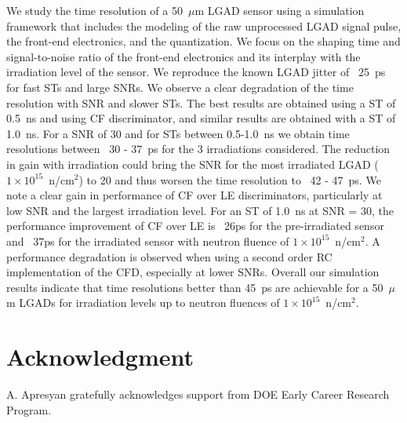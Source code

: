 \documentclass[preprint,1p]{elsarticle}
\begin{document}
We study the time resolution of a 50~$\mu$m LGAD sensor using a simulation framework that includes the
modeling of the raw unprocessed LGAD signal pulse, the front-end electronics, and the quantization.
We focus on the shaping time and signal-to-noise ratio of the front-end electronics and its interplay
with the irradiation level of the sensor. We reproduce the known LGAD jitter of ~25~\si{ps}
for fast STs and large SNRs. We observe a clear degradation of the time resolution with SNR and slower STs. The best results are
obtained using a ST of 0.5~\si{ns} and using CF discriminator, and similar results are obtained with a ST of 1.0~\si{ns}. For a SNR of 30
and for STs between 0.5-1.0~\si{ns} we obtain time resolutions between ~30 - 37~\si{ps} for the 3 irradiations considered. The
reduction in gain with irradiation could bring the SNR for the most irradiated LGAD ($1\times 10^{15}$~n/cm$^2$) to 20 and thus
worsen the time resolution to ~42 - 47~\si{ps}. We note a clear gain in performance of CF over LE discriminators, particularly at
low SNR and the largest irradiation level. For an ST of 1.0~\si{ns} at SNR = 30, the performance improvement of CF over LE
is ~26\si{ps} for the pre-irradiated sensor and ~37\si{ps} for the irradiated sensor with neutron fluence of
$1\times 10^{15}$~n/cm$^2$. A performance degradation is observed when using a {\color{red}second order RC} implementation of the CFD,
especially at lower SNRs. Overall our simulation results indicate that time resolutions better than
45~\si{ps} are achievable for a 50~$\mu$m LGADs for irradiation levels up to neutron fluences of $1\times 10^{15}$~n/cm$^2$.


\section*{Acknowledgment}


A. Apresyan gratefully acknowledges support from DOE Early Career Research Program.
\end{document}
